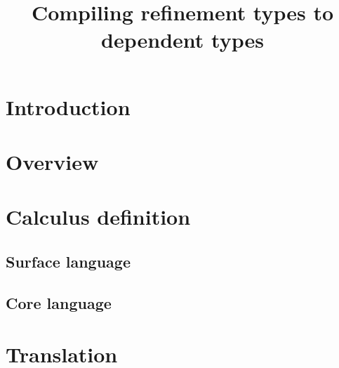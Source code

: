 \documentclass[12pt,a4paper]{article}
\title{Compiling refinement types to dependent types}
\begin{document}
\maketitle

\section{Introduction}

\section{Overview}

\section{Calculus definition}

\subsection{Surface language}


\subsection{Core language}

\section{Translation}
\end{document}
